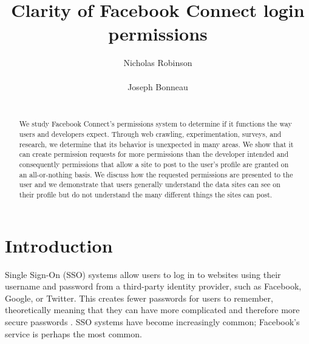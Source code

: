 \documentclass[10pt]{sig-alternate-10pt}
\begin{document}
\sloppy



\title{Clarity of Facebook Connect login permissions}

\author{
\alignauthor
Nicholas Robinson\\
       \\
\alignauthor
Joseph Bonneau\\
       \\
}

\maketitle

\begin{abstract}
We study Facebook Connect's permissions system to determine if it functions the way users and developers expect. Through web crawling, experimentation, surveys, and research, we determine that its behavior is unexpected in many areas. We show that it can create permission requests for more permissions than the developer intended and consequently permissions that allow a site to post to the user's profile are granted on an all-or-nothing basis. We discuss how the requested permissions are presented to the user and we demonstrate that users generally understand the data sites can see on their profile but do not understand the many different things the sites can post.
\end{abstract}


\section{Introduction}
Single Sign-On (SSO) systems allow users to log in to websites using their username and password from a third-party identity provider, such as Facebook, Google, or Twitter. This creates fewer passwords for users to remember, theoretically meaning that they can have more complicated and therefore more secure passwords \cite{openidsecurity}. SSO systems have become increasingly common; Facebook's service is perhaps the most common. 
\end{document}
